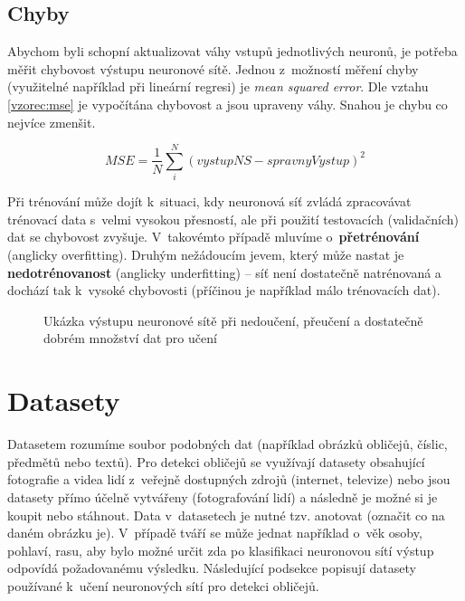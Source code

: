\subsection*{Chyby}
Abychom byli schopní aktualizovat váhy vstupů jednotlivých neuronů, je potřeba měřit chybovost výstupu neuronové sítě. Jednou z~možností měření chyby (využitelné například při lineární regresi) je \emph{mean squared error}. Dle vztahu \ref{vzorec:mse} je vypočítána chybovost a jsou upraveny váhy. Snahou je chybu co nejvíce zmenšit.

\begin{equation}
  \label{vzorec:mse}
  MSE = \frac{1}{N} \sum_{i}^{N} (vystupNS - spravnyVystup)^2
\end{equation}

Při trénování může dojít k~situaci, kdy neuronová síť zvládá zpracovávat trénovací data s~velmi vysokou přesností, ale při použití testovacích (validačních) dat se chybovost zvyšuje. V~takovémto případě mluvíme o~\textbf{přetrénování} (anglicky overfitting). Druhým nežádoucím jevem, který může nastat je \textbf{nedotrénovanost} (anglicky underfitting) -- síť není dostatečně natrénovaná a dochází tak k~vysoké chybovosti (příčinou je například málo trénovacích dat).


\begin{figure}[H]
  \begin{center}
  \label{obrazek:fitting}
  \caption{Ukázka výstupu neuronové sítě při nedoučení, přeučení a dostatečně dobrém množství dat pro učení}
  \end{center}
\end{figure}


\section{Datasety}
\label{sekce:datasety}
Datasetem rozumíme soubor podobných dat (například obrázků obličejů, číslic, předmětů nebo textů). Pro detekci obličejů se využívají datasety obsahující fotografie a videa lidí z~veřejně dostupných zdrojů (internet, televize) nebo jsou datasety přímo účelně vytvářeny (fotografování lidí) a následně je možné si je koupit nebo stáhnout. Data v~datasetech je nutné tzv. anotovat (označit co na daném obrázku je). V~případě tváří se může jednat například o~věk osoby, pohlaví, rasu, aby bylo možné určit zda po klasifikaci neuronovou sítí výstup odpovídá požadovanému výsledku. Následující podsekce popisují datasety používané k~učení neuronových sítí pro detekci obličejů.

